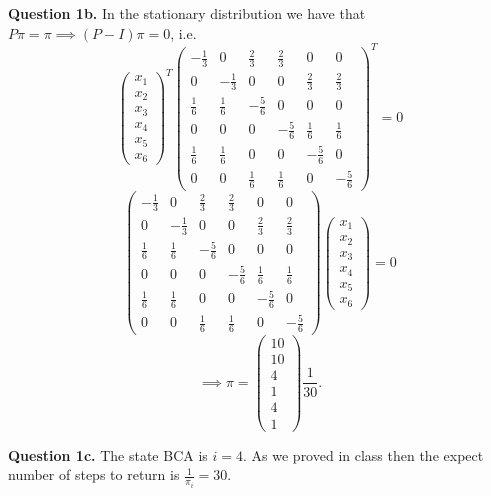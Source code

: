 \documentclass[letterpaper, reqno,11pt]{article}
\begin{document}
{\medskip\noindent\bf Question 1b.} In the stationary distribution we have that $P\pi=\pi \implies (P-I)\pi=0$, i.e.
\[
    \begin{pmatrix}x_1\\x_2\\x_3\\x_4\\x_5\\x_6\end{pmatrix}^T
    \begin{pmatrix}
        -\frac{1}{3}&0&\frac{2}{3}&\frac{2}{3}&0&0\\
        0&-\frac{1}{3}&0&0&\frac{2}{3}&\frac{2}{3}\\
        \frac{1}{6}&\frac{1}{6}&-\frac{5}{6}&0&0&0\\
        0&0&0&-\frac{5}{6}&\frac{1}{6}&\frac{1}{6}\\
        \frac{1}{6}&\frac{1}{6}&0&0&-\frac{5}{6}&0\\
        0&0&\frac{1}{6}&\frac{1}{6}&0&-\frac{5}{6}
        \end{pmatrix}^T=0
\]
\[
    \begin{pmatrix}
        -\frac{1}{3}&0&\frac{2}{3}&\frac{2}{3}&0&0\\
        0&-\frac{1}{3}&0&0&\frac{2}{3}&\frac{2}{3}\\
        \frac{1}{6}&\frac{1}{6}&-\frac{5}{6}&0&0&0\\
        0&0&0&-\frac{5}{6}&\frac{1}{6}&\frac{1}{6}\\
        \frac{1}{6}&\frac{1}{6}&0&0&-\frac{5}{6}&0\\
        0&0&\frac{1}{6}&\frac{1}{6}&0&-\frac{5}{6}
        \end{pmatrix}
    \begin{pmatrix}x_1\\x_2\\x_3\\x_4\\x_5\\x_6\end{pmatrix} =0
\]
\[
\implies \pi=\begin{pmatrix} 10\\10\\4\\1\\4\\1 \end{pmatrix} \frac{1}{30}
.\]

{\medskip\noindent\bf Question 1c.} The state BCA is $i=4$. As we proved in class then the expect number of steps to return is $\frac{1}{\pi_i}=30$.
\end{document}
